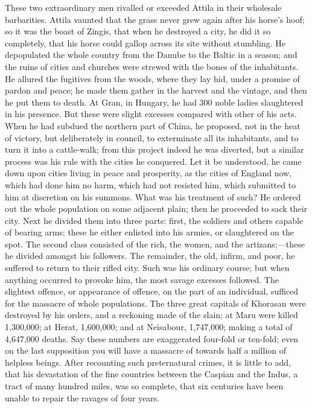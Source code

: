 These two extraordinary men
rivalled or exceeded Attila in their wholesale barbarities. Attila
vaunted that the grass never grew again after his horse's hoof; so it
was the boast of Zingis, that when he destroyed a city, he did it so
completely, that his horse could gallop across its site without
stumbling. He depopulated the whole country from the Danube to the
Baltic in a season; and the ruins of cities and churches were strewed
with the bones of the inhabitants. He allured the fugitives from the
woods, where they lay hid, under a promise of pardon and peace; he
made them gather in the harvest and the vintage, and then he put them
to death. At Gran, in Hungary, he had 300 noble ladies slaughtered in
his presence. But these were slight excesses compared with other of
his acts. When he had subdued the northern part of China, he proposed,
not in the heat of victory, but deliberately in council, to
exterminate all its inhabitants, and to turn it into a cattle-walk;
from this project indeed he was diverted, but a similar process was
his rule with the cities he conquered. Let it be understood, he came
down upon cities living in peace and prosperity, as the cities of England now, which had done him no harm, which had not resisted him,
which submitted to him at discretion on his summons. What was his
treatment of such? He ordered out the whole population on some
adjacent plain; then he proceeded to sack their city. Next he divided
them into three parts: first, the soldiers and others capable of
bearing arms; these he either enlisted into his armies, or slaughtered
on the spot. The second class consisted of the rich, the women, and
the artizans;—these he divided amongst his followers. The remainder,
the old, infirm, and poor, he suffered to return to their rifled city.
Such was his ordinary course; but when anything occurred to provoke
him, the most savage excesses followed. The slightest offence, or
appearance of offence, on the part of an individual, sufficed for the
massacre of whole populations. The three great capitals of Khorasan
were destroyed by his orders, and a reckoning made of the slain; at
Maru were killed 1,300,000; at Herat, 1,600,000; and at Neisabour,
1,747,000; making a total of 4,647,000 deaths. Say these numbers are
exaggerated four-fold or ten-fold; even on the last supposition you
will have a massacre of towards half a million of helpless beings.
After recounting such preternatural crimes, it is little to add, that
his devastation of the fine countries between the Caspian and the
Indus, a tract of many hundred miles, was so complete, that six
centuries have been unable to repair the ravages of four years.

